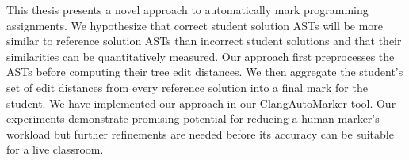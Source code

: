 
This thesis presents a novel approach to automatically mark programming assignments. We hypothesize that correct student solution ASTs will be more similar to reference solution ASTs than incorrect student solutions and that their similarities can be quantitatively measured. Our approach first preprocesses the ASTs before computing their tree edit distances. We then aggregate the student's set of edit distances from every reference solution into a final mark for the student. We have implemented our approach in our ClangAutoMarker tool. Our experiments demonstrate promising potential for reducing a human marker's workload but further refinements are needed before its accuracy can be suitable for a live classroom.
